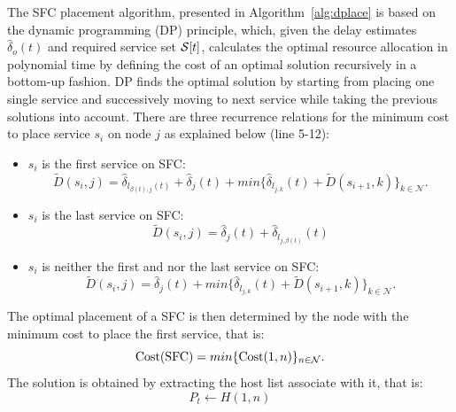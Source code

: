 The SFC placement algorithm, presented in Algorithm~\ref{alg:dplace} is based on the dynamic programming (DP) principle, which, given the delay estimates $\hat{\delta}_{o}(t)$ and required service set $\mathcal{S}[t]$,  calculates the optimal resource allocation in polynomial time by defining the cost of an optimal solution recursively in a bottom-up fashion. DP finds the optimal solution by starting from placing one single service and successively moving to next service while taking the previous solutions into account. There are three recurrence relations for the minimum cost to place service $s_{i}$ on node $j$ as explained below (line 5-12):
\begin{itemize}[leftmargin=*]
	\item $s_{i}$ is the first service on SFC:
	\begin{equation}
		\widetilde{D}(s_{i}, j) = \hat{\delta}_{l_{\beta(t), j}(t)} +  \hat{\delta}_j(t) %
		+ min\{\hat{\delta}_{l_{j, k}}(t) + \widetilde{D}(s_{i+1}, k)\}_{k\in \mathcal{N}}.
	\end{equation}
	\item $s_{i}$ is the last service on SFC:
	\begin{equation}
		\widetilde{D}(s_{i}, j) =  \hat{\delta}_j(t)+\hat{\delta}_{l_{j, \beta(t)}}(t)
	\end{equation}
	\item $s_{i}$ is neither the first and nor the last service on SFC:
	\begin{equation}
		\widetilde{D}(s_{i}, j) =  \hat{\delta}_j(t) 
		+ min\{\hat{\delta}_{l_{j, k}}(t) + \widetilde{D}(s_{i+1}, k)\}_{k\in \mathcal{N}}.
	\end{equation}
\end{itemize}
The optimal placement of a SFC is then determined by the node with the minimum cost to place the first service, that is:
\begin{equation}
	\text{Cost}(\text{SFC}) = min\{\text{Cost}(1,n)\}_{n\in\mathcal{N}}.
\end{equation}
The solution is obtained by extracting the host list associate with it, that is:
\begin{equation}
	P_{t}\leftarrow H(1, n)
\end{equation}

